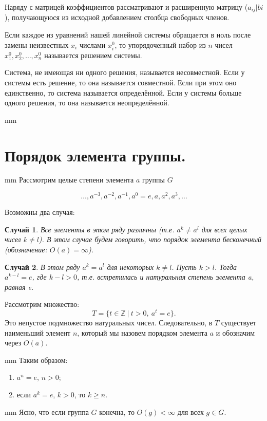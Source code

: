 \documentclass[12pt,english,russian]{article}
\newtheorem{sluch}{Случай}
\begin{document}
	Наряду с матрицей коэффициентов рассматривают и
	расширенную матрицу
	($a_{ij}|bi$), получающуюся из исходной добавлением столбца свободных членов.

	Если каждое из уравнений нашей линейной системы обращается в ноль после замены неизвестных 
	$x_i$ числами
	$x_i^0$, то упорядоченный набор из $n$ чисел
	$x_1^0, x_2^0, \dots , x_n^0$ называется решением
	системы. 

	Система, не имеющая ни одного решения, называется
	несовместной. Если у системы есть решение, то она называется
	совместной. Если при этом оно единственно, то система называется
	определённой. Если у системы больше одного решения, то она называется
	неопределённой.
	
	 mm
		\section{\bf Порядок элемента группы.}
	
	 mm
	Рассмотрим целые степени элемента $a$ группы $G$
	
	$$\dots ,a^{-3},a^{-2},a^{-1},a^0 = e,a,a^2,a^3,\dots$$
	
	Возможны два случая:
	\begin{sluch}
		Все элементы в этом ряду различны (т.е. $a^k \ne a^l$ для 
		всех целых чисел $k\ne l$). В этом случае будем говорить, 
		что порядок элемента бесконечный (обозначение: $O(a) = \infty$).
	\end{sluch}
	
	\begin{sluch}
		В этом ряду $a^k = a^l$ для некоторых $k \ne l$. Пусть $k > l$. 
		Тогда $a^{k-l}=e$, где $k-l > 0$, т.е. встретилась и натуральная 
		степень элемента a, равная e. 
	\end{sluch}
	Рассмотрим множество:
	\begin{equation}
		T = \{t \in \mathbb{Z} \ | \ t>0, \ a^t = e\}.
	\end{equation}
	Это непустое подмножество натуральных чисел. Следовательно, в
	$T$ существует наименьший элемент $n$, который мы назовем порядком элемента $a$
	и обозначим через $O(a)$.
	
		 mm
	Таким образом:
	\begin{enumerate}
		\item $a^n=e$, $n>0$;
		\item если $a^k=e$, $k>0$, то $k\geqslant n$.
	\end{enumerate}
	
	 mm
	Ясно, что если группа $G$ конечна, то $O(g) < \infty$ для 
	всех $g\in G$.
	
\end{document}
